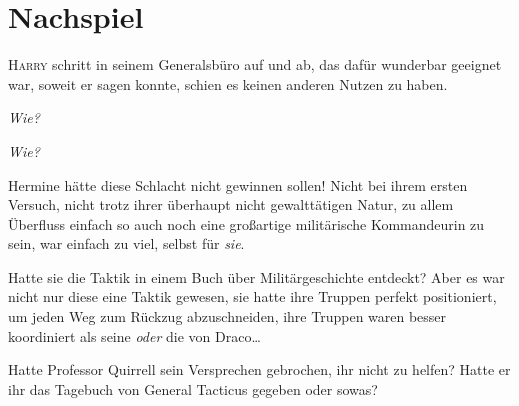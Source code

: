 
\section{Nachspiel}

\lettrine{H}{arry} schritt in seinem Generalsbüro auf und ab, das dafür wunderbar geeignet war, soweit er sagen konnte, schien es keinen anderen Nutzen zu haben.

\emph{Wie?}

\emph{Wie?}

Hermine hätte diese Schlacht nicht gewinnen sollen! Nicht bei ihrem ersten Versuch, nicht trotz ihrer überhaupt nicht gewalttätigen Natur, zu allem Überfluss einfach so auch noch eine großartige militärische Kommandeurin zu sein, war einfach zu viel, selbst für \emph{sie}.

Hatte sie die Taktik in einem Buch über Militärgeschichte entdeckt? Aber es war nicht nur diese eine Taktik gewesen, sie hatte ihre Truppen perfekt positioniert, um jeden Weg zum Rückzug abzuschneiden, ihre Truppen waren besser koordiniert als seine \emph{oder} die von Draco…

Hatte Professor Quirrell sein Versprechen gebrochen, ihr nicht zu helfen? Hatte er ihr das Tagebuch von General Tacticus gegeben oder sowas?%

